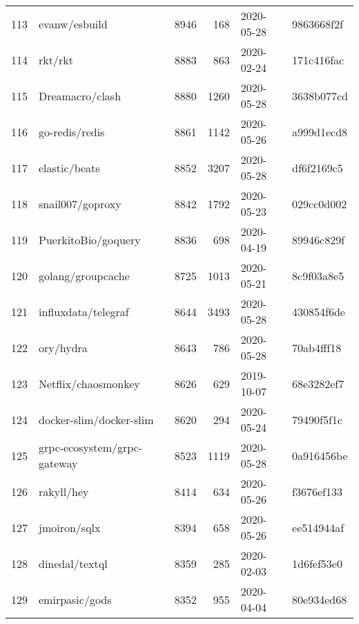 \begin{footnotesize}
\begin{longtable}{llrrll}
        113 &                                      evanw/esbuild &   8946 &    168 & 2020-05-28 &  9863668f2f \\
        114 &                                            rkt/rkt &   8883 &    863 & 2020-02-24 &  171c416fac \\
        115 &                                    Dreamacro/clash &   8880 &   1260 & 2020-05-28 &  3638b077cd \\
        116 &                                     go-redis/redis &   8861 &   1142 & 2020-05-26 &  a999d1ecd8 \\
        117 &                                      elastic/beats &   8852 &   3207 & 2020-05-28 &  df6f2169c5 \\
        118 &                                   snail007/goproxy &   8842 &   1792 & 2020-05-23 &  029cc0d002 \\
        119 &                                PuerkitoBio/goquery &   8836 &    698 & 2020-04-19 &  89946c829f \\
        120 &                                  golang/groupcache &   8725 &   1013 & 2020-05-21 &  8c9f03a8e5 \\
        121 &                                influxdata/telegraf &   8644 &   3493 & 2020-05-28 &  430854f6de \\
        122 &                                          ory/hydra &   8643 &    786 & 2020-05-28 &  70ab4fff18 \\
        123 &                                Netflix/chaosmonkey &   8626 &    629 & 2019-10-07 &  68e3282ef7 \\
        124 &                            docker-slim/docker-slim &   8620 &    294 & 2020-05-24 &  79490f5f1c \\
        125 &                        grpc-ecosystem/grpc-gateway &   8523 &   1119 & 2020-05-28 &  0a916456be \\
        126 &                                         rakyll/hey &   8414 &    634 & 2020-05-26 &  f3676ef133 \\
        127 &                                       jmoiron/sqlx &   8394 &    658 & 2020-05-26 &  ee514944af \\
        128 &                                     dinedal/textql &   8359 &    285 & 2020-02-03 &  1d6fef53e0 \\
        129 &                                     emirpasic/gods &   8352 &    955 & 2020-04-04 &  80e934ed68 \\

\end{longtable}
\end{footnotesize}
